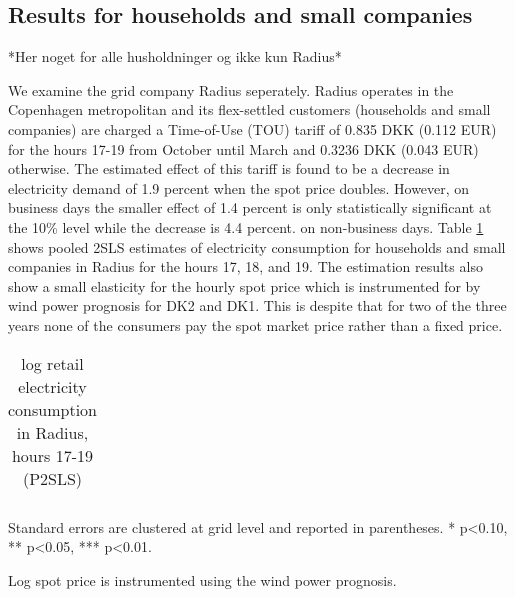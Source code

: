 \subsection{Results for households and small companies}
\label{subsec:r_households}

*Her noget for alle husholdninger og ikke kun Radius*

We examine the grid company Radius seperately. Radius operates in the Copenhagen metropolitan and its flex-settled customers (households and small companies) are charged a Time-of-Use (TOU) tariff of 0.835 DKK (0.112 EUR) for the hours 17-19 from October until March and 0.3236 DKK (0.043 EUR) otherwise. The estimated effect of this tariff is found to be a decrease in electricity demand of 1.9 percent when the spot price doubles. However, on business days the smaller effect of 1.4 percent is only statistically significant at the 10\% level while the decrease is 4.4 percent. on non-business days. Table \ref{tab:r_radius} shows pooled 2SLS estimates of electricity consumption for households and small companies in Radius for the hours 17, 18, and 19. The estimation results also show a small elasticity for the hourly spot price which is instrumented for by wind power prognosis for DK2 and DK1. This is despite that for two of the three years none of the consumers pay the spot market price rather than a fixed price. %
\begin{table}[H]
\begin{threeparttable}
  \vspace{-0.0cm}
  \centering
  \caption{log retail electricity consumption in Radius, hours 17-19 (P2SLS)}
  \label{tab:r_radius}
      \footnotesize
  \begin{tabular}{lccc}
        
  \end{tabular}
    \begin{tablenotes}
        \item  Standard errors are clustered at grid level and reported in parentheses. * p<0.10, ** p<0.05, *** p<0.01.
         \item Log spot price is instrumented using the wind power prognosis.
    \end{tablenotes}
  \vspace{-0.0cm}
  \end{threeparttable}
\end{table}


